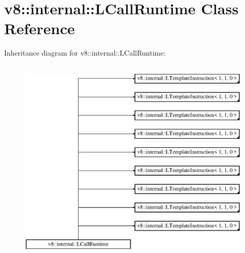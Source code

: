 \hypertarget{classv8_1_1internal_1_1_l_call_runtime}{}\section{v8\+:\+:internal\+:\+:L\+Call\+Runtime Class Reference}
\label{classv8_1_1internal_1_1_l_call_runtime}
Inheritance diagram for v8\+:\+:internal\+:\+:L\+Call\+Runtime\+:\begin{figure}[H]
\begin{center}
\leavevmode
\includegraphics[height=10.000000cm]{classv8_1_1internal_1_1_l_call_runtime}
\end{center}
\end{figure}
